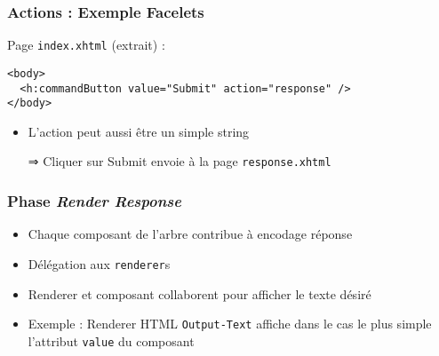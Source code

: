 \documentclass[english, french]{beamer}
\begin{document}
\begin{frame}[fragile]
	\frametitle{Actions : Exemple Facelets}
	Page \texttt{index.xhtml} (extrait) :
	\begin{lstlisting}[aboveskip=1em, belowskip=1em]
<body>
  <h:commandButton value="Submit" action="response" />
</body>
	\end{lstlisting}
	\begin{itemize}
		\item L’action peut aussi être un simple string
		\item[⇒] Cliquer sur Submit envoie à la page \texttt{response.xhtml}
	\end{itemize}
\end{frame}

\begin{frame}
	\frametitle{Phase \emph{Render Response}}
	\begin{itemize}
		\item Chaque composant de l’arbre contribue à encodage réponse
		\item Délégation aux \texttt{renderer}s
		\item Renderer et composant collaborent pour afficher le texte désiré
		\item Exemple : Renderer HTML \texttt{Output-Text} affiche {\tiny dans le cas le plus simple} l’attribut \texttt{value} du composant
	\end{itemize}
\end{frame}
\end{document}

